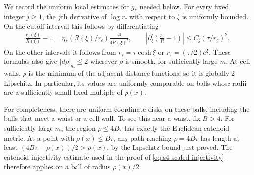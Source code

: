 \documentclass[a4paper,11pt,oneside,reqno]{amsart}
\numberwithin{equation}{section}
\theoremstyle{definition}
\begin{document}
We record the uniform local estimates for $g_*$ needed
below. For every fixed integer $j\geq1$, the $j$th derivative
of $\log r_\tau$ with respect to $\xi$ is uniformly bounded. On the
cutoff interval this follows by differentiating
%
\begin{align*}
    \frac{r_\tau(\xi)}{R(\xi)}-1
    =\eta_*(R(\xi)/r_c)\frac{\tau^2}{4R(\xi)^2},
    \qquad
    \left|\partial_\xi^j
      \left(\frac{r_\tau}{R}-1\right)\right|
      \leq C_j(\tau/r_c)^2.
\end{align*}
%
On the other intervals it follows from
$r_\tau=\tau\cosh\xi$ or $r_\tau=(\tau/2)e^\xi$.
These formulas also give
$|d\rho|_{g_*}\leq2$ wherever $\rho$ is smooth,
for sufficiently large $m$. At cell walls, $\rho$
is the minimum of the adjacent distance functions,
so it is globally $2$-Lipschitz. In particular, its
values are uniformly comparable on balls whose radii
are a sufficiently small fixed multiple of $\rho(x)$.

For completeness, there are uniform coordinate disks
on these balls, including the balls that meet a waist
or a cell wall. To see this near a waist, fix $B>4$.
For sufficiently large $m$, the region $\rho\leq4B\tau$
has exactly the Euclidean catenoid metric. At a point
with $\rho(x)\leq B\tau$, any path reaching
$\rho=4B\tau$ has length at least
$(4B\tau-\rho(x))/2>\rho(x)$, by the Lipschitz
bound just proved. The catenoid injectivity estimate
used in the proof of \eqref{eq:s4-scaled-injectivity}
therefore applies on a ball of radius $\rho(x)/2$.
\end{document}
